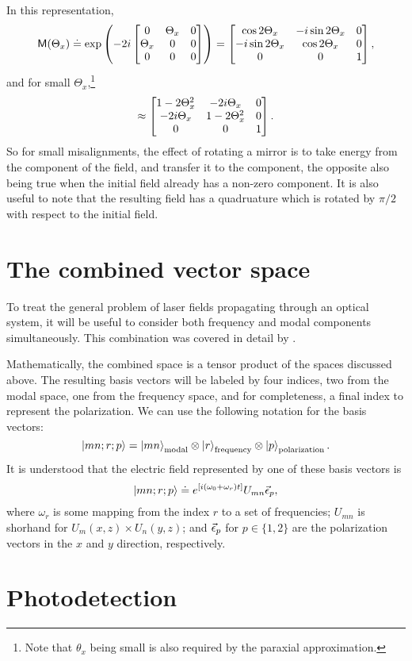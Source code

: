 In this representation, 
\begin{equation}
\mathsf{M}(\Theta_x) \doteq \exp \left( -2i 
\left[\begin{matrix} 
0 & \Theta_x & 0 \\
\Theta_x & 0 & 0 \\
0 & 0 & 0 
\end{matrix}\right]
\right)
=
\left[\begin{matrix}
\cos {2\Theta_x} & -i\sin{2\Theta_x}& 0 \\
-i\sin {2\Theta_x} & \cos{2\Theta_x}& 0 \\
0 & 0 & 1 \\
\end{matrix}\right] ,
\end{equation}
and for small $\Theta_x$,\footnote{Note that $\theta_x$ being small is also required by the paraxial approximation.}
\[
\approx
\left[\begin{matrix}
1-2\Theta_x^2 & -2i\Theta_x& 0 \\
-2i\Theta_x & 1-2\Theta_x^2& 0 \\
0 & 0 & 1 \\
\end{matrix}\right] .
\]
So for small misalignments, the effect of rotating a mirror is to take energy from the  component of the field, and transfer it to the  component, the opposite also being true when the initial field already has a non-zero  component. %
It is also useful to note that the resulting  field has a quadruature which is rotated by $\pi/2$ with respect to the initial  field.

\section{The combined vector space}
To treat the general problem of laser fields propagating through an optical system, it will be useful to consider both frequency and modal components simultaneously. %
This combination was covered in detail by \citet{Sigg:00}.

Mathematically, the combined space is a tensor product of the spaces discussed above. %
The resulting basis vectors will be labeled by four indices, two from the modal space, one from the frequency space, and for completeness, a final index to represent the polarization. %
We can use the following notation for the basis vectors:
\begin{equation}
\left| mn;r;p \right>=\left| mn \right>_{\text{modal}}\otimes\left| r \right>_{\text{frequency}}\otimes\left| p \right>_{\text{polarization}}.
\end{equation}
It is understood that the electric field represented by one of these basis vectors is
\[
\left| mn;r;p \right> \doteq e^{\left[ i\left( \omega_0+\omega_r\right)t\right]} U_{mn}\vec{\epsilon}_p,
\]
where $\omega_r$ is some mapping from the index $r$ to a set of frequencies; $U_{mn}$ is shorhand for $U_m(x,z)\times U_n(y,z)$; and $\vec{\epsilon}_p$ for $p\in \{1,2\}$ are the polarization vectors in the $x$ and $y$ direction, respectively.
\section{Photodetection}